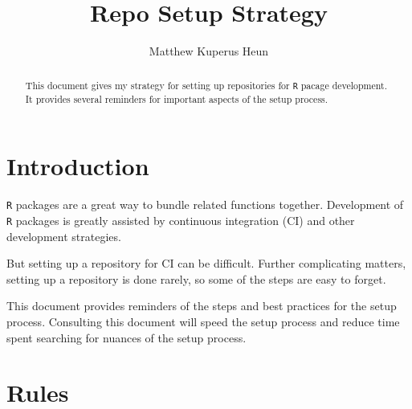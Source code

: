 \documentclass{article}
\begin{document}
\title{Repo Setup Strategy}
\author{Matthew Kuperus Heun}

\maketitle


\begin{abstract}

This document gives my strategy for setting up repositories for
\texttt{R} pacage development.
It provides several reminders for important aspects of the setup process.
\end{abstract}


\section{Introduction}
\label{sec:introduction}

\texttt{R} packages are a great way to bundle related functions together.
Development of \texttt{R} packages is greatly assisted by
continuous integration (CI) and other development strategies.

But setting up a repository for CI can be difficult.
Further complicating matters, setting up a repository is done rarely,
so some of the steps are easy to forget.

This document provides reminders of the steps
and best practices for the setup process.
Consulting this document will speed the setup process
and reduce time spent searching for nuances of the setup process.


\section{Rules}
\label{sec:rules}
\end{document}
